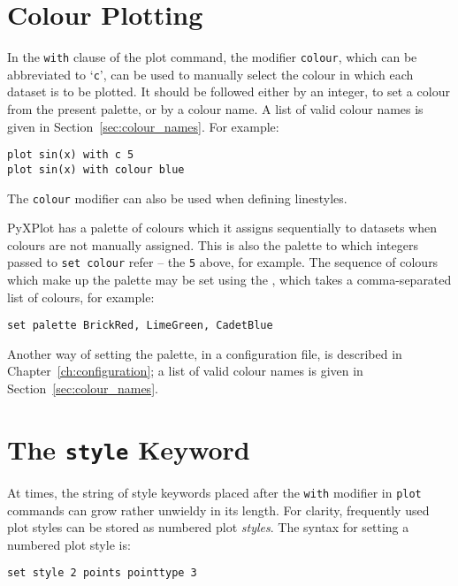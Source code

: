 \section{Colour Plotting}

 In the {\tt with} clause of the plot
command, the modifier {\tt colour}, which can be abbreviated to
`{\tt c}', can be used to manually select the colour in which each dataset
is to be plotted. It should be followed either by an integer, to set a colour
from the present palette, or by a colour name. A list of valid colour names is
given in Section~\ref{sec:colour_names}. For example:

\begin{verbatim}
plot sin(x) with c 5
plot sin(x) with colour blue
\end{verbatim}

\noindent The {\tt colour} modifier can also be used when defining linestyles.

 PyXPlot has a palette of
colours which it assigns sequentially to datasets when colours are not manually
assigned. This is also the palette to which integers passed to {\tt set colour}
refer -- the {\tt 5} above, for example. The sequence of colours which make up
the palette may be set using the , which takes a
comma-separated list of colours, for example:

\begin{verbatim}
set palette BrickRed, LimeGreen, CadetBlue
\end{verbatim}

\noindent Another way of setting the palette, in a configuration file, is
described in Chapter~\ref{ch:configuration}; a list of valid colour names is
given in Section~\ref{sec:colour_names}.

\section{The {\tt style} Keyword}

At times, the string of style keywords placed after the {\tt with} modifier in
{\tt plot} commands can grow rather unwieldy in its length. For clarity,
frequently used plot styles can be stored as numbered plot {\it styles}.  The
syntax for setting a numbered plot style is:

\begin{verbatim}
set style 2 points pointtype 3
\end{verbatim}

